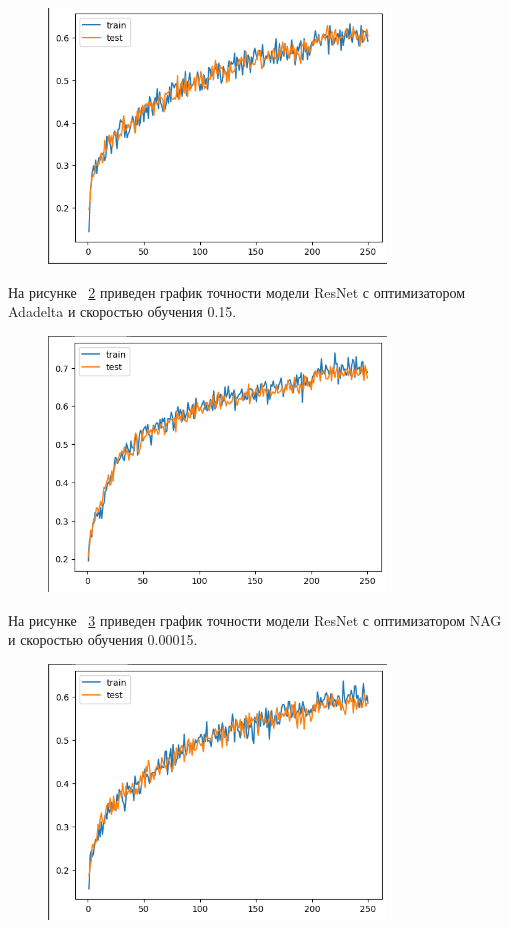 \documentclass[a4paper, 14pt]{extarticle}
\begin{document}
\begin{figure}[H]
\centering
\includegraphics[width=0.8\textwidth]{images/res9.png}
\caption{}
\label{fig:img9}
\end{figure}


На рисунке ~\ref{fig:img10} приведен график точности модели ResNet с оптимизатором Adadelta и скоростью обучения 0.15.

\begin{figure}[H]
\centering
\includegraphics[width=0.8\textwidth]{images/res10.png}
\caption{}
\label{fig:img10}
\end{figure}

На рисунке ~\ref{fig:img11} приведен график точности модели ResNet с оптимизатором NAG и скоростью обучения 0.00015.

\begin{figure}[H]
\centering
\includegraphics[width=0.8\textwidth]{images/res11.png}
\caption{}
\label{fig:img11}
\end{figure}
\end{document}
